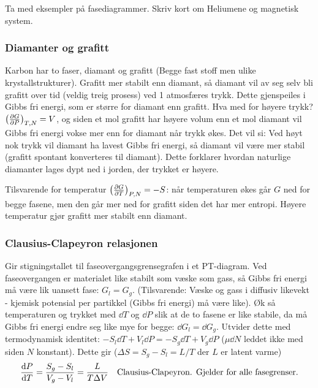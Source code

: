 \documentclass[12pt]{article}
\begin{document}
Ta med eksempler på fasediagrammer. Skriv kort om Heliumene og magnetisk system.
\subsubsection{Diamanter og grafitt}
Karbon har to faser, diamant og grafitt (Begge fast stoff men ulike krystallstrukturer). Grafitt
mer stabilt enn diamant, så diamant vil av seg selv bli grafitt over tid (veldig treig prosess) ved 1 atmosfæres trykk.
Dette gjenspeiles i Gibbs fri energi, som er større for diamant enn grafitt. Hva med for
høyere trykk? $\left( \pdv{G}{P} \right)_{T,N} = V$, og siden et mol grafitt har høyere
volum enn et mol diamant vil Gibbs fri energi vokse mer enn for diamant når trykk økes.
Det vil si: Ved høyt nok trykk vil diamant ha lavest Gibbs fri energi, så
diamant vil være mer stabil (grafitt spontant konverteres til diamant). Dette
forklarer hvordan naturlige diamanter lages dypt ned i jorden, der trykket er høyere.

Tilsvarende for temperatur $\left( \pdv{G}{T} \right)_{P,N} = -S$: når temperaturen
økes går $G$ ned for begge fasene, men den går mer ned for grafitt siden det har mer entropi. Høyere
temperatur gjør grafitt mer stabilt enn diamant.
\subsubsection{Clausius-Clapeyron relasjonen}
Gir stigningstallet til faseovergangsgrensegrafen i et PT-diagram. Ved faseovergangen
er materialet like stabilt som væske som gass, så Gibbs fri energi må være lik uansett
fase: $G_l = G_g$. (Tilsvarende: Væske og gass i diffusiv likevekt - kjemisk potensial per partikkel
(Gibbs fri energi) må være like).
Øk så temperaturen og trykket med $\dd T$ og $\dd P$ slik at de to fasene er like
stabile, da må Gibbs fri energi endre seg like mye for begge: $\dd G_l = \dd G_g$.
Utvider dette med termodynamisk identitet: $-S_l \dd T + V_l \dd P = -S_g \dd T + V_g \dd P$
($\mu \dd N$ leddet ikke med siden $N$ konstant). Dette gir ($\Delta S = S_g - S_l = L/T$ der $L$ er latent varme)
\begin{align*}
  \dv{P}{T} = \frac{S_g - S_l}{V_g - V_l} = \frac{L}{T \Delta V} \quad \text{Clausius-Clapeyron. Gjelder for alle fasegrenser.}
\end{align*}
\end{document}
